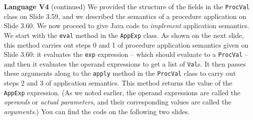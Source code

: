 \begin{minipage}[t]{\sw}
\slidenumber
\LARGE
{\bf Language V4} (continued)\exx
\Large
\emm{}\exx
\LARGE
We provided the structure of the fields
in the \verb'ProcVal' class on Slide 3.59,
and we described the semantics of a procedure application on Slide 3.60.
We now proceed to give Java code to {\em implement} application semantics.\exx
We start with the \verb'eval' method in the \verb'AppExp' class.
As shown on the next slide, 
this method carries out steps 0 and 1
of procedure application semantics given on Slide 3.60:
it evaluates the \verb'exp' expression --
which should evaluate to a \verb'ProcVal' --
and then it evaluates the operand expressions
to get a list of \verb'Val's.\exx
It then passes these arguments along
to the \verb'apply' method in the \verb'ProcVal' class
to carry out steps 2 and 3 of application semantics.
This method returns the value of the \verb'AppExp' expression.
(As we noted earlier, the operand expressions are called
the {\em operands} or {\em actual parameters},
and their corresponding values are called the {\em arguments}.)\exx
You can find the code on the following two slides.
\end{minipage}
\clearpage
